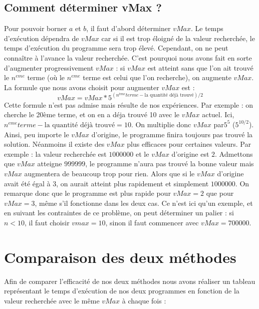 \documentclass{article}
\begin{document}
\subsection{Comment déterminer vMax ?}

Pour pouvoir borner $a$ et $b$, il faut d'abord déterminer $vMax$. Le temps d'exécution dépendra de $vMax$ car si il est trop éloigné de la valeur recherchée, le temps d'exécution du programme sera trop élevé. Cependant, on ne peut connaître à l'avance la valeur recherchée. C'est pourquoi nous avons fait en sorte d'augmenter progressivement $vMax$ : si $vMax$ est atteint sans que l'on ait trouvé le $n^{eme}$ terme (où le $n^{eme}$ terme est celui que l'on recherche), on augmente $vMax$. La formule que nous avons choisit pour augmenter $vMax$ est : \[vMax = vMax * 5^{(n^{ème} terme - \text{la quantité déjà trouvé})/2}\] Cette formule n'est pas admise mais résulte de nos expériences. Par exemple : on cherche le 20ème terme, et on en a déja trouvé 10 avec le $vMax$ actuel. Ici, $n^{eme} terme - \text{la quantité déjà trouvé} = 10$. On multiplie donc $vMax$ par$5^{5}$ ($5^{10/2}$). Ainsi, peu importe le $vMax$ d'origine, le programme finira toujours pas trouvé la solution. Néanmoins il existe des $vMax$ plus efficaces pour certaines valeurs. Par exemple : la valeur recherchée est $1 000 000$ et le $vMax$ d'origine est $2$. Admettons que $vMax$ atteigne $999 999$, le programme n'aura pas trouvé la bonne valeur mais $vMax$ augmentera de beaucoup trop pour rien. Alors que si le $vMax$ d'origine avait été égal à $3$, on aurait atteint plus rapidement et simplement $1 000 000$. On remarque donc que le programme est plus rapide pour $vMax = 2$ que pour $vMax = 3$, même s'il fonctionne dans les deux cas. Ce n'est ici qu'un exemple, et en suivant les contraintes de ce problème, on peut déterminer un palier : si $n < 10$, il faut choisir $vmax = 10$, sinon il faut commencer avec $vMax = 700 000$.

\section{Comparaison des deux méthodes}
Afin de comparer l'efficacité de nos deux méthodes nous avons réaliser un tableau représentant le temps d'exécution de nos deux programmes en fonction de la valeur recherchée avec le même $vMax$ à chaque fois :
\end{document}
